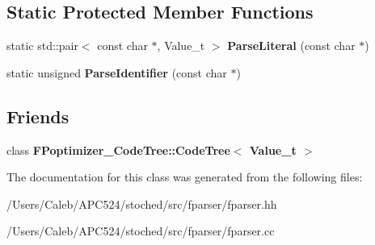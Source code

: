 \subsection*{Static Protected Member Functions}
\begin{DoxyCompactItemize}
\item 
\mbox{\label{class_function_parser_base_ad1e1645cc19dff08c61d38680fb18852}} 
static std\+::pair$<$ const char $\ast$, Value\+\_\+t $>$ {\bfseries Parse\+Literal} (const char $\ast$)
\item 
\mbox{\label{class_function_parser_base_a86b9cf2fafc3419ba7964db41fe88e9c}} 
static unsigned {\bfseries Parse\+Identifier} (const char $\ast$)
\end{DoxyCompactItemize}
\subsection*{Friends}
\begin{DoxyCompactItemize}
\item 
\mbox{\label{class_function_parser_base_acf3d682653499dcca599e0d88db26b48}} 
class {\bfseries F\+Poptimizer\+\_\+\+Code\+Tree\+::\+Code\+Tree$<$ Value\+\_\+t $>$}
\end{DoxyCompactItemize}


The documentation for this class was generated from the following files\+:\begin{DoxyCompactItemize}
\item 
/\+Users/\+Caleb/\+A\+P\+C524/stoched/src/fparser/fparser.\+hh\item 
/\+Users/\+Caleb/\+A\+P\+C524/stoched/src/fparser/fparser.\+cc\end{DoxyCompactItemize}
